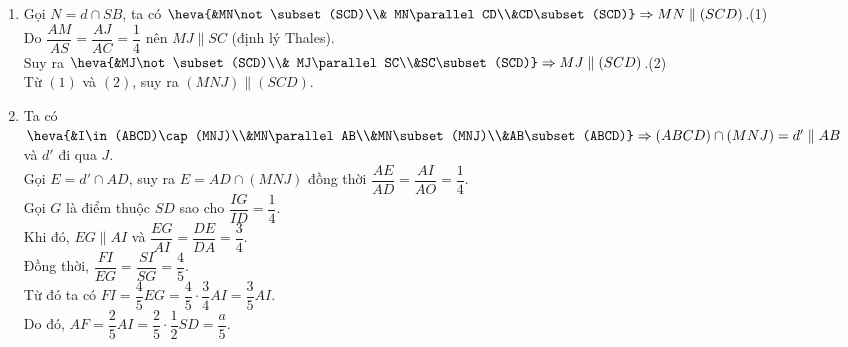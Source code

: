 \begin{ex}
{\begin{enumerate}
\item Gọi $N=d\cap SB$, ta có $\heva{&MN\not\subset (SCD)\\& MN\parallel CD\\&CD\subset (SCD)}\Rightarrow MN\parallel (SCD)$.\quad\quad (1)\\
Do $\dfrac{AM}{AS}=\dfrac{AJ}{AC}=\dfrac{1}{4}$ nên $MJ\parallel SC$ (định lý Thales).\\
Suy ra $\heva{&MJ\not\subset (SCD)\\& MJ\parallel SC\\&SC\subset (SCD)}\Rightarrow MJ\parallel (SCD)$.\quad\quad (2)\\
Từ $(1)$ và $(2)$, suy ra $(MNJ)\parallel (SCD)$.
\item Ta có $\heva{&I\in (ABCD)\cap (MNJ)\\&MN\parallel AB\\&MN\subset (MNJ)\\&AB\subset (ABCD)}\Rightarrow (ABCD)\cap (MNJ)=d'\parallel AB$ và $d'$ đi qua $J$.\\
Gọi $E=d'\cap AD$, suy ra $E=AD\cap (MNJ)$ đồng thời $\dfrac{AE}{AD}=\dfrac{AI}{AO}=\dfrac{1}{4}$.\\
Gọi $G$ là điểm thuộc $SD$ sao cho $\dfrac{IG}{ID}=\dfrac{1}{4}$.\\
Khi đó, $EG\parallel AI$ và $\dfrac{EG}{AI}=\dfrac{DE}{DA}=\dfrac{3}{4}$.\\
Đồng thời, $\dfrac{FI}{EG}=\dfrac{SI}{SG}=\dfrac{4}{5}$.\\
Từ đó ta có $FI=\dfrac{4}{5}EG=\dfrac{4}{5}\cdot \dfrac{3}{4}AI=\dfrac{3}{5}AI$.\\
Do đó, $AF=\dfrac{2}{5}AI=\dfrac{2}{5}\cdot \dfrac{1}{2}SD=\dfrac{a}{5}$.
\end{enumerate}
}
\end{ex}

